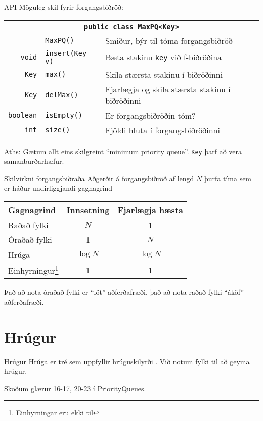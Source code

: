 \documentclass{beamer}
\begin{document}
\begin{frame}{API}
Möguleg skil fyrir forgangsbiðröð:
\begin{center}
\begin{tabularx}{\textwidth}{rlX}
\toprule
\multicolumn{3}{c}{\texttt{public class MaxPQ<Key>}}\\
\midrule
-&\texttt{MaxPQ()}& Smiður, býr til tóma forgangsbiðröð\\
\texttt{void}&\texttt{insert(Key v)}&Bæta stakinu \texttt{key} við f-biðröðina\\
\texttt{Key}&\texttt{max()}&Skila stærsta stakinu í biðröðinni\\
\texttt{Key}&\texttt{delMax()}&Fjarlægja og skila stærsta stakinu í biðröðinni\\
\texttt{boolean}&\texttt{isEmpty()}&Er forgangsbiðröðin tóm?\\
\texttt{int}&\texttt{size()}&Fjöldi hluta í forgangsbiðröðinni\\
\bottomrule
\end{tabularx}
\end{center}
Aths: Gætum allt eins skilgreint ``minimum priority queue''. \texttt{Key} þarf að vera samanburðarhæfur.
\end{frame}

\begin{frame}{Skilvirkni forgangsbiðraða}
Aðgerðir á forgangsbiðröð af lengd $N$ þurfa tíma sem er háður undirliggjandi gagnagrind
\begin{center}
\begin{tabular}{lcc}
\toprule
Gagnagrind&Innsetning&Fjarlægja hæsta\\
\midrule
Raðað fylki&$N$&1\\
Óraðað fylki&1&$N$\\
Hrúga&$\log N$&$\log N$\\
Einhyrningur\footnote{Einhyrningar eru ekki til}&1&1\\
\bottomrule
\end{tabular}
\end{center}
Það að nota óraðað fylki er ``löt'' aðferðafræði, það að nota raðað fylki ``áköf'' aðferðafræði.
\end{frame}

\section{Hrúgur}

\begin{frame}{Hrúgur}
Hrúga  er tré sem uppfyllir hrúguskilyrði . Við notum fylki til að geyma hrúgur.

Skoðum glærur 16-17, 20-23 í \href{http://algs4.cs.princeton.edu/lectures/24PriorityQueues.pdf}{PriorityQueues}.
\end{frame}
\end{document}
